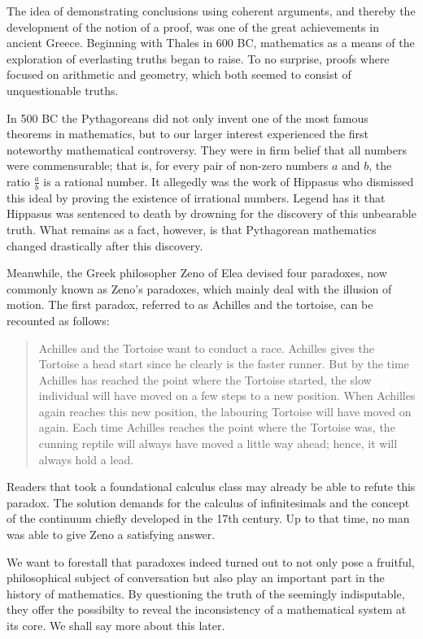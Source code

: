 \documentclass[hidelinks]{article}
\begin{document}
The idea of demonstrating conclusions using coherent arguments, and thereby the development of the notion of a proof, was one of the great achievements in ancient Greece.
Beginning with Thales in 600 BC, mathematics as a means of the exploration of everlasting truths began to raise. To no surprise, proofs where focused on arithmetic and geometry, which both seemed to consist of unquestionable truths.

In 500 BC the Pythagoreans did not only invent one of the most famous theorems in mathematics, but to our larger interest experienced the first noteworthy mathematical controversy. They were in firm belief that all numbers were commensurable; that is, for every pair of non-zero numbers $a$ and $b$, the ratio $\frac{a}{b}$ is a rational number. It allegedly was the work of Hippasus who dismissed this ideal by proving the existence of irrational numbers. Legend has it that Hippasus was sentenced to death by drowning for the discovery of this unbearable truth. What remains as a fact, however, is that Pythagorean mathematics changed drastically after this discovery.

Meanwhile, the Greek philosopher Zeno of Elea devised four paradoxes, now commonly known as Zeno's paradoxes, which mainly deal with the illusion of motion. The first paradox, referred to as Achilles and the tortoise, can be recounted as follows:
\begin{quote}\label{zeno_paradox}
Achilles and the Tortoise want to conduct a race. Achilles gives the Tortoise a head start since he clearly is the faster runner. But by the time Achilles has reached the point where the Tortoise started, the slow individual will have moved on a few steps to a new position. When Achilles again reaches this new position, the labouring Tortoise will have moved on again. Each time Achilles reaches the point where the Tortoise was, the cunning reptile will always have moved a little way ahead; hence, it will always hold a lead.
\end{quote}
Readers that took a foundational calculus class may already be able to refute this paradox. The solution demands for the calculus of infinitesimals and the concept of the continuum chiefly developed in the 17th century. Up to that time, no man was able to give Zeno a satisfying answer.

We want to forestall that paradoxes indeed turned out to not only pose a fruitful, philosophical subject of conversation but also play an important part in the history of mathematics. By questioning the truth of the seemingly indisputable, they offer the possibilty to reveal the inconsistency of a mathematical system at its core. We shall say more about this later.
\end{document}
